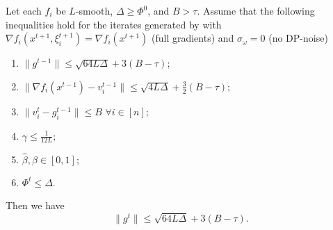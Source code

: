 \documentclass[a4paper,11pt]{article}
\begin{document}
\begin{lemma}\label{lem:bound_gt_norm}
    Let each $f_i$ be $L$-smooth, $\Delta \ge \Phi^0$, and $B > \tau$. Assume that the following inequalities hold for the iterates generated by  with $\nabla f_i(x^{t+1},\xi^{t+1}_i) = \nabla f_i(x^{t+1})$ (full gradients) and $\sigma_{\omega} = 0$ (no DP-noise)
    \begin{enumerate}
        \item $\|g^{t-1}\| \le \sqrt{64L\Delta} + 3(B-\tau)$;
        \item $\|\nabla f_i(x^{t-1}) - v_i^{t-1}\| \le \sqrt{4L\Delta} + \frac{3}{2}(B-\tau);$
        \item $\|v_i^t - g_i^{t-1}\| \le B$ $\forall i\in[n]$;
        \item $\gamma \le \frac{1}{12L};$
        \item $\hat{\beta},\beta\in [0,1];$
        \item $\Phi^t \le \Delta$.
    \end{enumerate}
    Then we have 
    \begin{equation}
        \|g^t\| \le \sqrt{64L\Delta} + 3(B-\tau).
    \end{equation}
\end{lemma}
\end{document}
